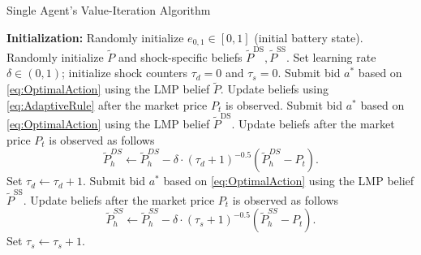 \documentclass{article}
\theoremstyle{definition}
\theoremstyle{plain}
\begin{document}
\begin{algorithm}
\caption{Single Agent's Value-Iteration Algorithm}
\label{Algo_meanfield}
\begin{algorithmic}[1]
\State \textbf{Initialization:}
\State Randomly initialize \( e_{0,1} \in [0,1] \) (initial battery state).
\State Randomly initialize \( \widetilde{P} \) and shock-specific beliefs \( \widetilde{P}^{\text{DS}}, \widetilde{P}^{\text{SS}} \).
\State Set learning rate \( \delta \in (0,1) \); initialize shock counters $\tau_{d} = 0 $ and  $\tau_{s} = 0$.
\vskip8pt
                \State Submit bid \( a^* \) based on \eqref{eq:OptimalAction} using the LMP belief \( \widetilde{P} \). 
                \State Update beliefs using \eqref{eq:AdaptiveRule} after the market price \( P_t \) is observed. 
                \State Submit bid \( a^* \) based on \eqref{eq:OptimalAction} using the LMP belief \( \widetilde{P}^{\text{DS}} \).
                 \State Update beliefs after the market price \( P_t \) is observed as follows 
                \begin{equation*}
\widetilde{P}^{DS}_{h} \leftarrow \widetilde{P}^{DS}_{h} - \delta \cdot (\tau_d+1)^{-0.5}(\widetilde{P}^{DS}_{h} - P_{t}).
\end{equation*}
              \State Set $\tau_d \leftarrow \tau_d+1$.
                \State Submit bid \( a^* \) based on \eqref{eq:OptimalAction} using the LMP belief \( \widetilde{P}^{\text{SS}} \).
                \State Update beliefs after the market price \( P_t \) is observed as follows 
                \begin{equation*}
\widetilde{P}^{SS}_{h} \leftarrow \widetilde{P}^{SS}_{h} - \delta \cdot (\tau_s+1)^{-0.5}(\widetilde{P}^{SS}_{h} - P_{t}). 
\end{equation*}
              \State Set $\tau_s \leftarrow \tau_s+1$.
            \EndIf
    \EndFor
\EndFor
\end{algorithmic}
\end{algorithm}
\end{document}
